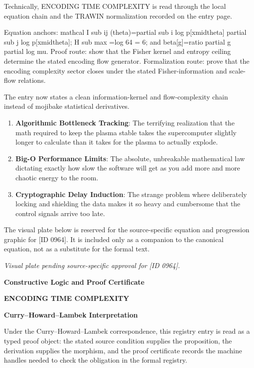 Technically, ENCODING TIME COMPLEXITY is read through the local equation chain and the TRAWIN normalization recorded on the entry page.

Equation anchors: mathcal I sub ij (theta)=partial sub i log p[xmidtheta] partial sub j log p[xmidtheta]; H sub max =log 64 = 6; and beta[g]=ratio partial g partial log mu. Proof route: show that the Fisher kernel and entropy ceiling determine the stated encoding flow generator. Formalization route: prove that the encoding complexity sector closes under the stated Fisher-information and scale-flow relations.

The entry now states a clean information-kernel and flow-complexity chain instead of mojibake statistical derivatives.
\endgroup

\begin{enumerate}[leftmargin=1.6em,itemsep=6pt,topsep=4pt]
\item \textbf{Algorithmic Bottleneck Tracking}: The terrifying realization that the math required to keep the plasma stable takes the supercomputer slightly longer to calculate than it takes for the plasma to actually explode.
\item \textbf{Big-O Performance Limits}: The absolute, unbreakable mathematical law dictating exactly how slow the software will get as you add more and more chaotic energy to the room.
\item \textbf{Cryptographic Delay Induction}: The strange problem where deliberately locking and shielding the data makes it so heavy and cumbersome that the control signals arrive too late.
\end{enumerate}

\begingroup\footnotesize\sloppy
The visual plate below is reserved for the source-specific equation and progression graphic for [ID 0964]. It is included only as a companion to the canonical equation, not as a substitute for the formal text.
\par\endgroup
\begingroup\footnotesize\itshape
Visual plate pending source-specific approval for [ID 0964].
\par\endgroup

\clearpage
\begingroup\tzpsupportsetup
\noindent\textbf{\fontsize{10.8pt}{12.8pt}\selectfont [ID 0964] Constructive Logic and Proof Certificate}\par
\noindent\textbf{\fontsize{10pt}{12pt}\selectfont ENCODING TIME COMPLEXITY}\par
\vspace{0.45em}
\begingroup
\footnotesize
\setlength{\parskip}{0.22em}
\setlength{\parindent}{0pt}
\noindent\textbf{Curry--Howard--Lambek Interpretation}\par
Under the Curry--Howard--Lambek correspondence, this registry entry is read as a typed proof
object: the stated source condition supplies the proposition, the derivation supplies the
morphism, and the proof certificate records the machine handles needed to check the obligation
in the formal registry.

